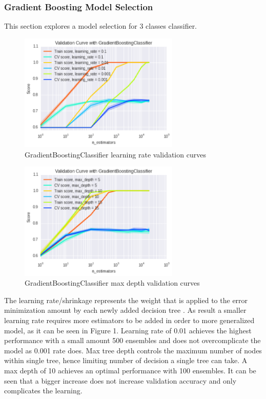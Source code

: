 \subsubsection{Gradient Boosting Model Selection}
This section explores a model selection for 3 classes classifier.

\begin{figure}[h]
\centering
\includegraphics[width=3.0in]{figures/v_curve1}
\caption{GradientBoostingClassifier learning rate validation curves} 
\label{fig:gradient1}
\end{figure}

\begin{figure}[h]
\centering
\includegraphics[width=3.0in]{figures/v_curve2}
\caption{GradientBoostingClassifier max depth validation curves}
\label{fig:gradient2}
\end{figure}

The learning rate/shrinkage represents the weight that is applied to the error minimization amount by each newly added decision tree \cite{biasvariance}. As result a smaller learning rate requires more estimators to be added in order to more generalized model, as it can be seen in Figure 1. Learning rate of 0.01 achieves the highest performance with a small amount 500 ensembles and does not overcomplicate the model as 0.001 rate does. Max tree depth controls the maximum number of nodes within single tree, hence limiting number of decision a single tree can take. A max depth of 10 achieves an optimal performance with 100 ensembles. It can be seen that a bigger increase does not increase validation accuracy and only complicates the learning. 

